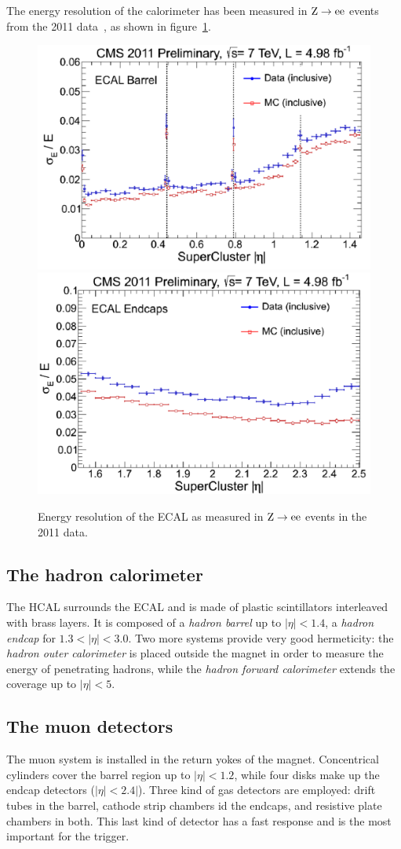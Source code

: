 The energy resolution of the calorimeter has been measured in $\mathrm{Z}
\rightarrow \mathrm{e}\mathrm{e}$ events from the 2011 data~\cite{CMS-DP-2012-007}, as shown in
figure~\ref{fig:ecal_resolution}.

\begin{figure}[htb]
    \centering
    \includegraphics[width=.48\textwidth]{images/pdf/ecal_barrel_resolution}
    \includegraphics[width=.48\textwidth]{images/pdf/ecal_endcap_resolution}
    \caption{Energy resolution of the ECAL as measured in $\mathrm{Z} \rightarrow
    \mathrm{e}\mathrm{e}$ events in the 2011 data.}
    \label{fig:ecal_resolution}
\end{figure}

\subsection{The hadron calorimeter}
The HCAL surrounds the ECAL and is made of plastic scintillators interleaved with brass layers.
It is composed of a \emph{hadron barrel} up to $|\eta| < 1.4$, a
\emph{hadron endcap} for $1.3 < |\eta| < 3.0$. Two more systems provide
very good hermeticity: the \emph{hadron outer calorimeter} is placed
outside  the magnet in order to measure the energy of penetrating hadrons,
while the \emph{hadron forward calorimeter} extends the coverage up to
$|\eta| < 5$.

\subsection{The muon detectors}
The muon system is installed in the return yokes of the magnet. Concentrical
cylinders cover the barrel region up to $|\eta| < 1.2$, while four disks
make up the endcap detectors ($|\eta| < 2.4|$). Three kind of gas detectors
are employed: drift tubes in the barrel, cathode strip chambers id the
endcaps, and resistive plate chambers in both. This last kind of detector
has a fast response and is the most important for the trigger.

